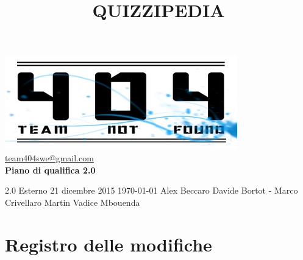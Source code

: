 \documentclass[a4paper,11pt]{article}
\title{\textbf{{\fontsize{8mm}{5mm}\selectfont QUIZZIPEDIA}}}
\date{}
\author{}
\begin{document}
	\maketitle
	\thispagestyle{empty}
	\begin{center}	
	\includegraphics{../../team_not_found}
	\fontsize{5mm}{3mm}\url{team404swe@gmail.com}\\
	
	\vspace{50mm}
	\textbf{Piano di qualifica 2.0}
	\end{center}
			{2.0} 							%
			{Esterno} 						%
			{21 dicembre 2015} 				%
			{\today} 						%
			{Alex Beccaro}	%
			{Davide Bortot - Marco Crivellaro } 	%
			{Martin Vadice Mbouenda} 			%
	\newpage
	\thispagestyle{empty}
	\null  %

	\newpage
	\newpage
	\fancyfoot[R]{\thepage}
	
	\hspace{30 mm}
	\section*{Registro delle modifiche}
	
\end{document}
